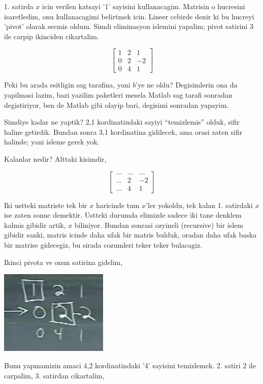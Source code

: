 \documentclass[12pt,fleqn]{article}\usepackage{../common}
\begin{document}
1. satirda $x$ icin verilen katsayi '1' sayisini kullanacagim. Matrisin o
hucresini isaretledim, onu kullanacagimi belirtmek icin. Lineer cebirde
denir ki bu hucreyi 'pivot' olarak secmis oldum. Simdi eliminasyon islemini
yapalim; pivot satirini 3 ile carpip ikinciden cikartalim.

$$ 
\left[\begin{array}{rrr}
    1 & 2 & 1 \\
    0 & 2 & -2 \\
    0 & 4 & 1
  \end{array}\right]
$$

Peki bu arada esitligin sag tarafina, yani $b$'ye ne oldu? Degisimlerin ona
da yapilmasi lazim, bazi yazilim paketleri mesela Matlab sag tarafi
sonradan degistiriyor, ben de Matlab gibi olayip bari, degisimi sonradan
yapayim. 

Simdiye kadar ne yaptik? 2,1 kordinatindaki sayiyi ``temizlemis'' olduk,
sifir haline getirdik. Bundan sonra 3,1 kordinatina gidilecek, ama orasi
zaten sifir halinde; yani isleme gerek yok. 

Kalanlar nedir? Alttaki kisimdir,

$$ 
\left[\begin{array}{rrr}
    \dots & \dots & \dots \\
    \dots &  2 & -2 \\
    \dots & 4 &  1
  \end{array}\right]
$$

Iki ustteki matriste tek bir $x$ haricinde tum $x$'ler yokoldu, tek kalan
1. satirdaki $x$ ise zaten sonuc demektir. Ustteki durumda elimizde sadece
iki tane denklem kalmis gibidir artik, $x$ biliniyor. Bundan sonrasi
ozyineli (recursive) bir islem gibidir sanki, matris icinde daha ufak bir
matris bulduk, oradan daha ufak baska bir matrise gidecegiz, bu sirada
cozumleri teker teker bulacagiz.

Ikinci pivota ve onun satirina gidelim,

\includegraphics[height=4cm]{2_02.png}

Bunu yapmamizin amaci 4,2 kordinatindaki '4' sayisini temizlemek. 2. satiri
2 ile carpalim, 3. satirdan cikartalim,
\end{document}

